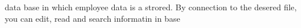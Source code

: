 data base in which employee data is a strored. By connection to the desered file, you can edit, read and search informatin in base 